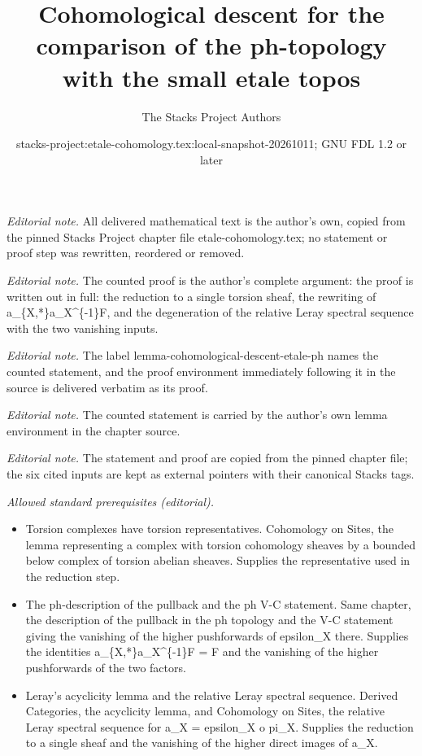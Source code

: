 \documentclass[10pt,a4paper]{amsart}
\title{Cohomological descent for the comparison of the ph-topology with the small etale topos}
\author{The Stacks Project Authors}
\date{stacks-project:etale-cohomology.tex:local-snapshot-20261011; GNU FDL 1.2 or later}
\theoremstyle{plain}
\theoremstyle{definition}
\theoremstyle{remark}
\numberwithin{equation}{subsection}
\begin{document}
\maketitle
\noindent\textit{Editorial note.} All delivered mathematical text is the author's own, copied from the pinned Stacks Project chapter file etale-cohomology.tex; no statement or proof step was rewritten, reordered or removed.\par\medskip
\noindent\textit{Editorial note.} The counted proof is the author's complete argument: the proof is written out in full: the reduction to a single torsion sheaf, the rewriting of a\_\{X,*\}a\_X\textasciicircum{}\{-1\}F, and the degeneration of the relative Leray spectral sequence with the two vanishing inputs.\par\medskip
\noindent\textit{Editorial note.} The label lemma-cohomological-descent-etale-ph names the counted statement, and the proof environment immediately following it in the source is delivered verbatim as its proof.\par\medskip
\noindent\textit{Editorial note.} The counted statement is carried by the author's own lemma environment in the chapter source.\par\medskip
\noindent\textit{Editorial note.} The statement and proof are copied from the pinned chapter file; the six cited inputs are kept as external pointers with their canonical Stacks tags.\par\medskip
\noindent\textit{Allowed standard prerequisites (editorial).}\begin{itemize}
\item Torsion complexes have torsion representatives. Cohomology on Sites, the lemma representing a complex with torsion cohomology sheaves by a bounded below complex of torsion abelian sheaves. Supplies the representative used in the reduction step.
\item The ph-description of the pullback and the ph V-C statement. Same chapter, the description of the pullback in the ph topology and the V-C statement giving the vanishing of the higher pushforwards of epsilon\_X there. Supplies the identities a\_\{X,*\}a\_X\textasciicircum{}\{-1\}F = F and the vanishing of the higher pushforwards of the two factors.
\item Leray's acyclicity lemma and the relative Leray spectral sequence. Derived Categories, the acyclicity lemma, and Cohomology on Sites, the relative Leray spectral sequence for a\_X = epsilon\_X o pi\_X. Supplies the reduction to a single sheaf and the vanishing of the higher direct images of a\_X.
\end{itemize}\medskip
\end{document}
